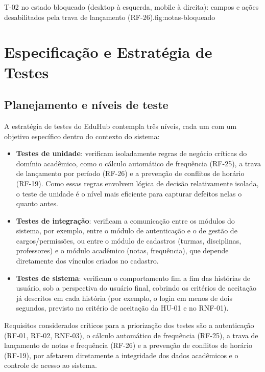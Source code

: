 %
{T-02 no estado bloqueado (desktop à esquerda, mobile à direita): campos e ações desabilitados pela trava de lançamento (RF-26).}{fig:notas-bloqueado}

\chapter{Especificação e Estratégia de Testes}

\section{Planejamento e níveis de teste}

A estratégia de testes do EduHub contempla três níveis, cada um com um
objetivo específico dentro do contexto do sistema:

\begin{itemize}
    \item \textbf{Testes de unidade}: verificam isoladamente regras de
    negócio críticas do domínio acadêmico, como o cálculo automático de
    frequência (RF-25), a trava de lançamento por período (RF-26) e a
    prevenção de conflitos de horário (RF-19). Como essas regras envolvem
    lógica de decisão relativamente isolada, o teste de unidade é o nível
    mais eficiente para capturar defeitos nelas o quanto antes.
    \item \textbf{Testes de integração}: verificam a comunicação entre os
    módulos do sistema, por exemplo, entre o módulo de autenticação e o de
    gestão de cargos/permissões, ou entre o módulo de cadastros (turmas,
    disciplinas, professores) e o módulo acadêmico (notas, frequência), que
    depende diretamente dos vínculos criados no cadastro.
    \item \textbf{Testes de sistema}: verificam o comportamento fim a fim das
    histórias de usuário, sob a perspectiva do usuário final, cobrindo os
    critérios de aceitação já descritos em cada história (por exemplo, o
    login em menos de dois segundos, previsto no critério de aceitação da
    HU-01 e no RNF-01).
\end{itemize}

Requisitos considerados críticos para a priorização dos testes são a
autenticação (RF-01, RF-02, RNF-03), o cálculo automático de frequência
(RF-25), a trava de lançamento de notas e frequência (RF-26) e a prevenção
de conflitos de horário (RF-19), por afetarem diretamente a integridade dos
dados acadêmicos e o controle de acesso ao sistema.

